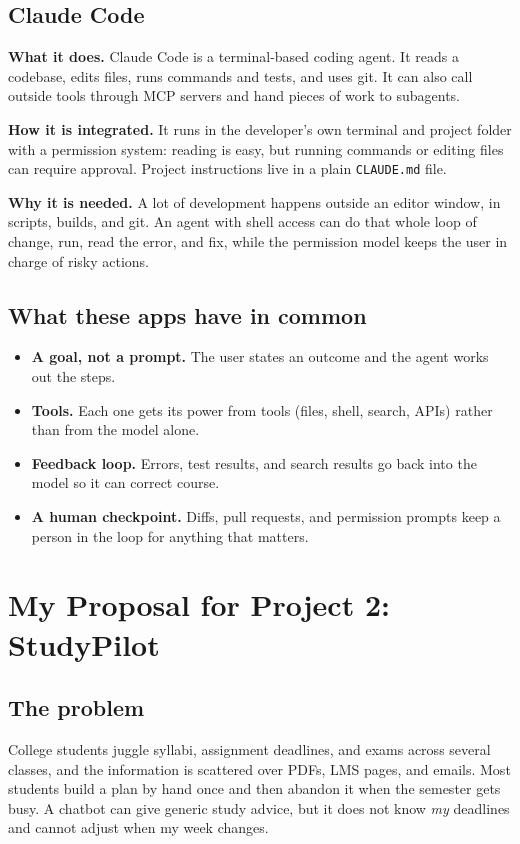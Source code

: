 \documentclass[11pt]{article}
\begin{document}
\subsection{Claude Code}
\textbf{What it does.} Claude Code is a terminal-based coding agent. It reads a
codebase, edits files, runs commands and tests, and uses git. It can also call
outside tools through MCP servers and hand pieces of work to subagents.

\textbf{How it is integrated.} It runs in the developer's own terminal and
project folder with a permission system: reading is easy, but running commands or
editing files can require approval. Project instructions live in a plain
\texttt{CLAUDE.md} file.

\textbf{Why it is needed.} A lot of development happens outside an editor window,
in scripts, builds, and git. An agent with shell access can do that whole loop of
change, run, read the error, and fix, while the permission model keeps the user in
charge of risky actions.

\subsection{What these apps have in common}
\begin{itemize}
  \item \textbf{A goal, not a prompt.} The user states an outcome and the agent
        works out the steps.
  \item \textbf{Tools.} Each one gets its power from tools (files, shell, search,
        APIs) rather than from the model alone.
  \item \textbf{Feedback loop.} Errors, test results, and search results go back
        into the model so it can correct course.
  \item \textbf{A human checkpoint.} Diffs, pull requests, and permission prompts
        keep a person in the loop for anything that matters.
\end{itemize}

\section{My Proposal for Project 2: StudyPilot}

\subsection{The problem}
College students juggle syllabi, assignment deadlines, and exams across several
classes, and the information is scattered over PDFs, LMS pages, and emails. Most
students build a plan by hand once and then abandon it when the semester gets busy.
A chatbot can give generic study advice, but it does not know \emph{my} deadlines
and cannot adjust when my week changes.
\end{document}
